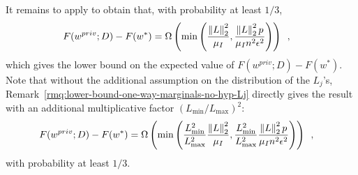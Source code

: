 It remains to apply  to obtain that, with
probability at least $1/3$,
\begin{align}
  F(w^{priv}; D) - F(w^*)
   & = \Omega\left( \min\left(\frac{\left \lVert L \right \rVert_2^2}{\mu_I}, \frac{\left \lVert L \right \rVert_2^2 p}{\mu_I n^2\epsilon^2}\right)\right)\enspace,
\end{align}
which gives the lower bound on the expected value of $F(w^{priv}; D) - F(w^*)$.
Note that without the additional assumption on the distribution of the $L_j$'s,
Remark~\ref{rmq:lower-bound-one-way-marginals-no-hyp-Lj} directly gives the
result with an additional multiplicative factor $(L_{\min} / L_{\max})^2$:
\begin{align}
  F(w^{priv}; D) - F(w^*)
   & = \Omega\left( \min\left(\frac{L_{\min}^2}{L_{\max}^2}\frac{\left \lVert L \right \rVert_2^2}{\mu_I},
    \frac{L_{\min}^2}{L_{\max}^2}\frac{\left \lVert L \right \rVert_2^2 p}{\mu_I n^2\epsilon^2}\right)\right)\enspace,
\end{align}
with probability at least $1/3$.



